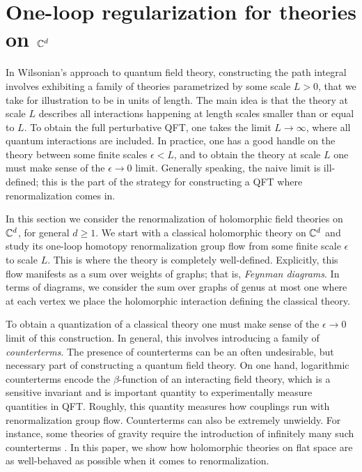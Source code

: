 \documentclass[10pt]{amsart}
\begin{document}
\section{One-loop regularization for theories on $\mathbb C^d$} \label{sec: hol renorm}

In Wilsonian's approach to quantum field theory, constructing the path integral involves exhibiting a family of theories parametrized by some scale $L > 0$, that we take for illustration to be in units of length. 
The main idea is that the theory at scale $L$ describes all interactions happening at length scales smaller than or equal to $L$. 
To obtain the full perturbative QFT, one takes the limit $L \to \infty$, where all quantum interactions are included. 
In practice, one has a good handle on the theory between some finite scales $\epsilon < L$, and to obtain the theory at scale $L$ one must make sense of the $\epsilon \to 0$ limit. 
Generally speaking, the naive limit is ill-defined; this is the part of the strategy for constructing a QFT where renormalization comes in. 

In this section we consider the renormalization of holomorphic field theories on $\mathbb C^d$, for general $d \geq 1$. 
We start with a classical holomorphic theory on $\mathbb C^d$ and study its one-loop homotopy renormalization group flow from some finite scale $\epsilon$ to scale $L$.
This is where the theory is completely well-defined. 
Explicitly, this flow manifests as a sum over weights of graphs; that is, {\em Feynman diagrams}.
In terms of diagrams, we consider the sum over graphs of genus at most one where at each vertex we place the holomorphic interaction defining the classical theory.

To obtain a quantization of a classical theory one must make sense of the $\epsilon \to 0$ limit of this construction. 
In general, this involves introducing a family of {\em counterterms}.
The presence of counterterms can be an often undesirable, but necessary part of constructing a quantum field theory.
On one hand, logarithmic counterterms encode the $\beta$-function of an interacting field theory, which is a sensitive invariant and is important quantity to experimentally measure quantities in QFT.
Roughly, this quantity measures how couplings run with renormalization group flow. 
Counterterms can also be extremely unwieldy. 
For instance, some theories of gravity require the introduction of infinitely many such counterterms \cite{THooftVelt}.
In this paper, we show how holomorphic theories on flat space are as well-behaved as possible when it comes to renormalization. 
\end{document}
